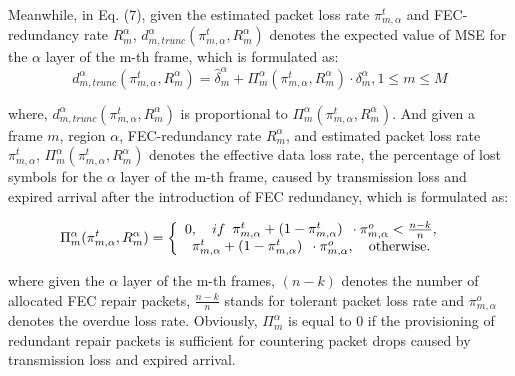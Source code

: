 Meanwhile, in Eq. (7), given the estimated packet loss rate $\pi _{m,\alpha }^t$ and FEC-redundancy rate $R_m^\alpha$, $d_{m,trunc}^\alpha(\pi _{m,\alpha }^t, R_m^\alpha)$ denotes the expected value of MSE for the $\alpha$ layer of the m-th frame, which is
formulated as:
\[d_{m,trunc}^\alpha (\pi _{m,\alpha }^t, R_m^\alpha) = \widehat \delta _m^\alpha  + \Pi _m^\alpha (\pi _{m,\alpha }^t, R_m^\alpha )\cdot\delta _m^\alpha ,1 \le m \le M\]	

where, $d_{m,trunc}^\alpha (\pi _{m,\alpha }^t, R_m^\alpha)$ is proportional to $\Pi _m^\alpha (\pi _{m,\alpha }^t, R_m^\alpha )$. And given a frame $m$, region $\alpha$, FEC-redundancy rate $R_m^\alpha$, and estimated packet loss rate $\pi _{m,\alpha }^t$,
$\Pi _m^\alpha (\pi _{m,\alpha }^t, R_m^\alpha )$ denotes the effective data loss rate, \ie the percentage of lost symbols for the $\alpha$ layer of the m-th frame, caused by transmission loss and expired arrival after the introduction of FEC redundancy,  which is
formulated as:
\begin{small}
\begin{eqnarray}
&\Pi _m^\alpha(\pi _{m,\alpha }^t,R_m^\alpha)  = \left\{ {\begin{array}{*{20}{l}}
{0,\begin{array}{*{20}{c}}
{}
\end{array}if\begin{array}{*{20}{c}}
{\pi _{m,\alpha }^t + (1 - \pi _{m,\alpha }^t)}
\end{array}\cdot\pi _{m,\alpha }^o < \frac{{n - k}}{n},}\\
{\begin{array}{*{20}{c}}
{\pi _{m,\alpha }^t + (1 - \pi _{m,\alpha }^t)}
\end{array} \cdot \pi _{m,\alpha }^o,\begin{array}{*{20}{c}}
{}
\end{array}{\rm{otherwise}}.}
\end{array}} \right.
\end{eqnarray}
\end{small}

where given the $\alpha$ layer of the m-th frames, $(n-k)$ denotes the number of allocated FEC repair packets, $\frac{{n - k}}{n}$ stands for tolerant packet loss rate and $\pi _{m,\alpha }^o$ denotes the overdue loss rate. Obviously, $\Pi _m^\alpha$ is equal to 0 if the provisioning of redundant repair packets is sufficient for countering packet drops caused by transmission loss and expired arrival. 



